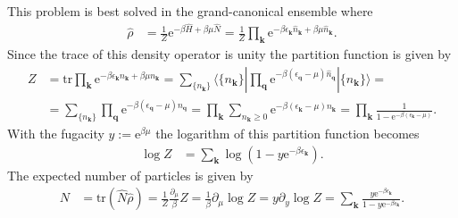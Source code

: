 \documentclass[english, parskip=full]{scrartcl}
\newcommand{\kla}{}
\newcommand{\tecxt}{}
\renewcommand{\i}{\text{i}}
\newcommand{\e}{\text{e}}
\begin{document}

This problem is best solved in the grand-canonical ensemble where
\begin{align}
\hat{\rho} &= \frac{1}{Z} \e^{-\beta \hat{H} + \beta\mu \hat{N}} = \frac{1}{Z} \prod_\textbf{k} \e^{-\beta \epsilon_\textbf{k} \hat{n}_\textbf{k} + \beta \mu \hat{n}_\textbf{k}}.
\end{align}
Since the trace of this density operator is unity the partition function is given by
\begin{align}
Z &= \tecxt\text{tr} \prod_\textbf{k} \e^{-\beta \epsilon_\textbf{k} n_\textbf{k} + \beta \mu n_\textbf{k}} = \sum_{\{n_\textbf{k}\}} \langle \{n_\textbf{k}\} | \prod_\textbf{q} \e^{-\beta (\epsilon_\textbf{q} - \mu) \hat{n}_\textbf{q}} | \{n_\textbf{k} \} \rangle = \\
&= \sum_{\{n_\textbf{k}\}} \prod_\textbf{q} \e^{-\beta (\epsilon_\textbf{q} - \mu) n_\textbf{q}} = \prod_\textbf{k} \sum_{n_\textbf{k} \ge 0} \e^{-\beta (\epsilon_\textbf{k} - \mu) n_\textbf{k}} = \prod_\textbf{k} \frac{1}{1 - \e^{-\beta (\epsilon_\textbf{k} - \mu)}}.
\end{align}
With the fugacity $y := \e^{\beta\mu}$ the logarithm of this partition function becomes
\begin{align}
\log Z &= \sum_\textbf{k} \log \kla\left( 1 - y\e^{-\beta\epsilon_\textbf{k}} \right).
\end{align}
The expected number of particles is given by
\begin{align}
N &= \tecxt\text{tr} (\hat{N} \hat{\rho}) = \frac{1}{Z} \frac{\partial_\mu }{\beta} Z = \frac{1}{\beta} \partial_\mu \log Z = y\partial_y \log Z = \sum_\textbf{k} \frac{y\e^{-\beta\epsilon_\textbf{k}}}{1 - y\e^{-\beta\epsilon_\textbf{k}}}.
\end{align}
\end{document}
